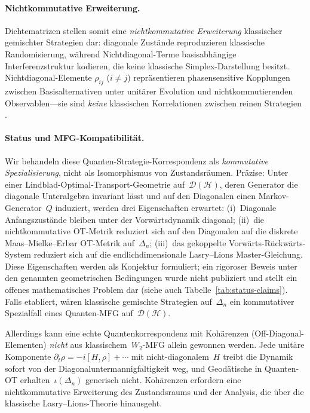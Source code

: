 \documentclass[12pt,a4paper]{article}
\theoremstyle{remark}
\begin{document}
\paragraph{Nichtkommutative Erweiterung.}
Dichtematrizen stellen somit eine \emph{nichtkommutative Erweiterung} klassischer gemischter Strategien dar: diagonale Zust\"ande reproduzieren klassische Randomisierung, w\"ahrend Nichtdiagonal-Terme basisabh\"angige Interferenzstruktur kodieren, die keine klassische Simplex-Darstellung besitzt. Nichtdiagonal-Elemente $\rho_{ij}$ ($i \neq j$) repr\"asentieren phasensensitive Kopplungen zwischen Basisalternativen unter unit\"arer Evolution und nichtkommutierenden Observablen---sie sind \emph{keine} klassischen Korrelationen zwischen reinen Strategien \citep{Lindblad1976}.

\paragraph{Status und MFG-Kompatibilit\"at.}
Wir behandeln diese Quanten-Strategie-Korrespondenz als \emph{kommutative Spezialisierung}, nicht als Isomorphismus von Zustandsr\"aumen. Pr\"azise: Unter einer Lindblad-Optimal-Transport-Geometrie auf~$\mathcal{D}(\mathcal{H})$, deren Generator die diagonale Unteralgebra invariant l\"asst und auf den Diagonalen einen Markov-Generator~$Q$ induziert, werden drei Eigenschaften erwartet: (i)~Diagonale Anfangszust\"ande bleiben unter der Vorw\"artsdynamik diagonal; (ii)~die nichtkommutative OT-Metrik reduziert sich auf den Diagonalen auf die diskrete Maas--Mielke--Erbar OT-Metrik auf~$\Delta_n$; (iii)~das gekoppelte Vorw\"arts-R\"uckw\"arts-System reduziert sich auf die endlichdimensionale Lasry--Lions Master-Gleichung. Diese Eigenschaften werden als Konjektur formuliert; ein rigoroser Beweis unter den genannten geometrischen Bedingungen wurde nicht publiziert und stellt ein offenes mathematisches Problem dar (siehe auch Tabelle~\ref{tab:status-claims}). Falls etabliert, w\"aren klassische gemischte Strategien auf~$\Delta_n$ ein kommutativer Spezialfall eines Quanten-MFG auf~$\mathcal{D}(\mathcal{H})$.

Allerdings kann eine echte Quantenkorrespondenz mit Koh\"arenzen (Off-Diagonal-Elementen) \emph{nicht} aus klassischem~$W_2$-MFG allein gewonnen werden. Jede unit\"are Komponente $\partial_t \rho = -i[H, \rho] + \cdots$ mit nicht-diagonalem~$H$ treibt die Dynamik sofort von der Diagonaluntermannigfaltigkeit weg, und Geod\"atische in Quanten-OT erhalten~$\iota(\Delta_n)$ generisch nicht. Koh\"arenzen erfordern eine nichtkommutative Erweiterung des Zustandsraums und der Analysis, die \"uber die klassische Lasry--Lions-Theorie hinausgeht.
\end{document}
